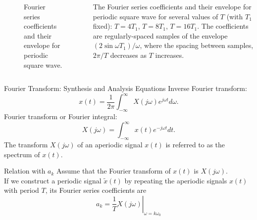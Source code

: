 \begin{frame}[plain,t]
    \begin{columns}
        {
        \begin{figure}
          \centering
          
          \caption{Fourier series coefficients and their envelope for periodic square wave.}\label{fi:periodic_square_fs_samples_of_envilope}
        \end{figure}
        }
        {
            \small
            \noindent The Fourier series coefficients and their envelope for periodic square wave for several values of $T$ (with $T_1$ fixed): $T=4T_1$, $T=8T_1$, $T=16T_1$. The coefficients are regularly-spaced samples of the envelope $(2\sin \omega T_1)/\omega$, where the spacing between samples, $2\pi/T$ decreases as $T$ increases.
        }
    \end{columns}
\end{frame}


\begin{frame}{Fourier Transform: Synthesis and Analysis Equations}
    Inverse Fourier transform:
    \begin{equation}\label{eq:ift}
        x(t) = \frac{1}{2\pi}\int_{-\infty}^{\infty}X(j\omega)e^{j\omega t} d\omega.
    \end{equation}
    Fourier transform or Fourier integral:
    \begin{equation}\label{eq:ft}
        X(j\omega) = \int_{-\infty}^{\infty}x(t)e^{-j\omega t} dt.
    \end{equation}
    The transform $X(j\omega)$ of an aperiodic signal $x(t)$ is referred to as the spectrum of $x(t)$.
\end{frame}

\begin{frame}{Relation with $a_k$}
    Assume that the Fourier transform of $x(t)$ is $X(j\omega)$.\\
    If we construct a periodic signal $\tilde{x}(t)$ by repeating the aperiodic signals $x(t)$ with period $T$, its Fourier series coefficients are
    \begin{equation}
        a_k = \left.\frac{1}{T}X(j\omega)\right|_{\omega=k\omega_0}
    \end{equation}
\end{frame}

